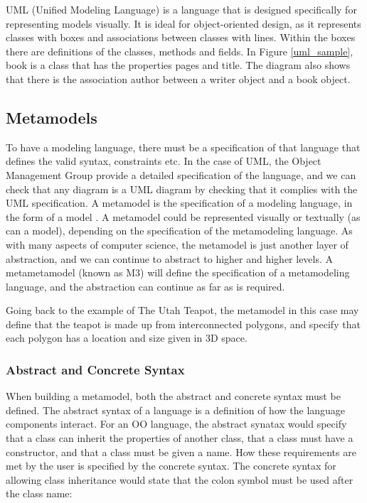UML (Unified Modeling Language) is a language that is designed specifically for representing models visually. It is ideal for object-oriented design, as it represents classes with boxes and associations between classes with lines. Within the boxes there are definitions of the classes, methods and fields. In Figure \ref{uml_sample}, book is a class that has the properties pages and title. The diagram also shows that there is the association author between a writer object and a book object.

\subsection{Metamodels}
To have a modeling language, there must be a specification of that language that defines the valid syntax, constraints etc. In the case of UML, the Object Management Group provide a detailed specification \citep{umlSpec} of the language, and we can check that any diagram is a UML diagram by checking that it complies with the UML specification.
A metamodel is the specification of a modeling language, in the form of a model \citep{brambillaBook}. A metamodel could be represented visually or textually (as can a model), depending on the specification of the metamodeling language. As with many aspects of computer science, the metamodel is just another layer of abstraction, and we can continue to abstract to higher and higher levels. A metametamodel (known as M3) will define the specification of a metamodeling language, and the abstraction can continue as far as is required.

Going back to the example of The Utah Teapot, the metamodel in this case may define that the teapot is made up from interconnected polygons, and specify that each polygon has a location and size given in 3D space. 

\subsubsection{Abstract and Concrete Syntax}

When building a metamodel, both the abstract and concrete syntax must be defined. The abstract syntax of a language is a definition of how the language components interact. For an OO language, the abstract synatax would specify that a class can inherit the properties of another class, that a class must have a constructor, and that a class must be given a name. How these requirements are met by the user is specified by the concrete syntax. The concrete syntax for allowing class inheritance would state that the colon symbol must be used after the class name:

